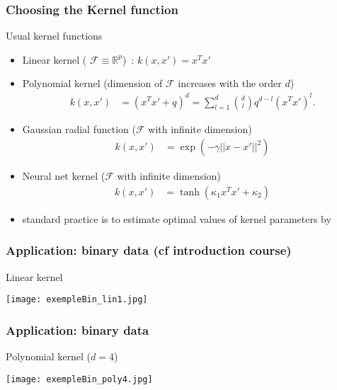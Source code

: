 \begin{frame}
  \frametitle{Choosing the Kernel function}


  \begin{block}{Usual kernel functions}
\begin{itemize}
 \item  Linear kernel ( $\mathcal{F} \equiv \mathbb{R}^p$)~:
 $
    k(x,x') =x^T x'
$
 \item  Polynomial kernel (dimension of $\mathcal{F}$ increases with the order $d$)
 \begin{align*}
    k(x,x') &=(x^T x'+q)^d = \sum_{l=1}^d\binom{d}{l}q^{d-l}(x^Tx')^l.
 \end{align*}
  \item Gaussian radial function ($\mathcal{F}$ with infinite dimension)
 \begin{align*}
    k(x,x') &= \exp{\left( - \gamma ||x - x'||^2\right)}
 \end{align*}
   \item  Neural net kernel ($\mathcal{F}$ with infinite dimension)
 \begin{align*}
    k(x,x') &= \tanh{\left( \kappa_1 x^T x' + \kappa_2 \right)}
 \end{align*}
\item[\doigt] standard practice is to estimate optimal values of kernel parameters  by 
\end{itemize}
 \end{block}

\end{frame}


\begin{frame}
  \frametitle{Application: binary data  (cf introduction course)}
  
  \begin{block}{Linear kernel}
    \begin{center}
      \texttt{[image: exempleBin\_lin1.jpg]}%
    \end{center}
  \end{block}
\end{frame}

\begin{frame}
  \frametitle{Application: binary data}


  \begin{block}{Polynomial kernel ($d=4$)}
    \begin{center}
      \texttt{[image: exempleBin\_poly4.jpg]}\\
    \end{center}
    
  \end{block}
\end{frame}


